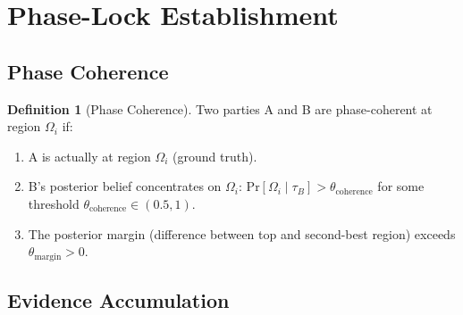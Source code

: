 \documentclass[twocolumn,10pt,a4paper]{article}
\theoremstyle{plain}
\theoremstyle{definition}
\newtheorem{definition}[theorem]{Definition}
\newcommand{\pr}[1]{\mathrm{Pr}\left[#1\right]}
\newcommand{\given}{\mid}
\begin{document}
\section{Phase-Lock Establishment}
\label{sec:phase-lock}

\subsection{Phase Coherence}

\begin{definition}[Phase Coherence]
Two parties A and B are phase-coherent at region $\Omega_i$ if:
\begin{enumerate}
\item A is actually at region $\Omega_i$ (ground truth).
\item B's posterior belief concentrates on $\Omega_i$: $\pr{\Omega_i \given \tau_B} > \theta_{\text{coherence}}$ for some threshold $\theta_{\text{coherence}} \in (0.5, 1)$.
\item The posterior margin (difference between top and second-best region) exceeds $\theta_{\text{margin}} > 0$.
\end{enumerate}
\end{definition}

\subsection{Evidence Accumulation}
\end{document}
